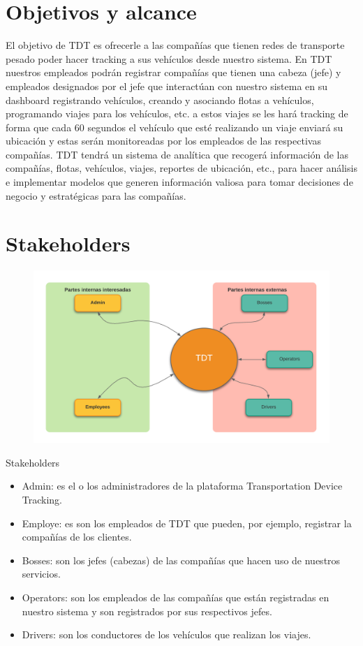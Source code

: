 \documentclass{article}
\begin{document}
\section{Objetivos y alcance} 
El objetivo de TDT es ofrecerle a las compañías que tienen redes de transporte pesado poder hacer tracking a sus vehículos desde nuestro sistema. En TDT nuestros empleados podrán registrar compañías que tienen una cabeza (jefe) y empleados designados por el jefe que interactúan con nuestro sistema en su dashboard registrando vehículos, creando y asociando flotas a vehículos, programando viajes para los vehículos, etc. a estos viajes se les hará tracking de forma que cada 60 segundos el vehículo que esté realizando un viaje enviará su ubicación y estas serán monitoreadas por los empleados de las respectivas compañías. TDT tendrá un sistema de analítica que recogerá información de las compañías, flotas, vehículos, viajes, reportes de ubicación, etc., para hacer análisis e implementar modelos que generen información valiosa para tomar decisiones de negocio y estratégicas para las compañías.

\newpage
\section{Stakeholders}
\begin{center}
\begin{figure}[h]
    \centering
    \includegraphics[scale=.15]{pics/stakeholders.png}%
    \label{fig:stakeholders}\end{figure}
    \large{Stakeholders}
\end{center}
\begin{itemize}
    \item Admin: es el o los administradores de la plataforma Transportation Device Tracking.
    \item Employe: es son los empleados de TDT que pueden, por ejemplo, registrar la compañías de los clientes.
    \item Bosses: son los jefes (cabezas) de las compañías que hacen uso de nuestros servicios.
    \item Operators: son los empleados de las compañías que están registradas en nuestro sistema y son registrados por sus respectivos jefes.
    \item Drivers: son los conductores de los vehículos que realizan los viajes.
\end{itemize}
\end{document}
